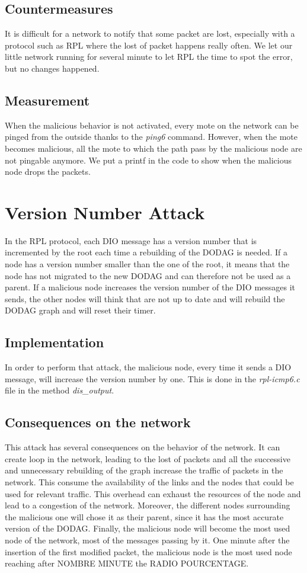 \documentclass{report}
\begin{document}
\subsection*{Countermeasures}
It is difficult for a network to notify that some packet are lost, especially with a protocol such as RPL where the lost of packet happens really often. We let our little network running for several minute to let RPL the time to spot the error, but no changes happened.

\subsection*{Measurement }
When the malicious behavior is not activated, every mote on the network can be pinged from the outside thanks to the \textit{ping6} command. However, when the mote becomes malicious, all the mote to which the path pass by the malicious node are not pingable anymore. We put a printf in the code to show when the malicious node drops the packets. 

\section{Version Number Attack}
In the RPL protocol, each DIO message has a version number that is incremented by the root each time a rebuilding of the DODAG is needed. If a node has a version number smaller than the one of the root, it means that the node has not migrated to the new DODAG and can therefore not be used as a parent. If a malicious node increases the version number of the DIO messages it sends, the other nodes will think that are not up to date and will rebuild the DODAG graph and will reset their timer.

\subsection*{Implementation}
In order to perform that attack, the malicious node, every time it sends a DIO message, will increase the version number by one. This is done in the \textit{rpl-icmp6.c} file in the method \textit{dis\_output}.

\subsection*{Consequences on the network}
This attack has several consequences on the behavior of the network. It can create loop in the network, leading to the lost of packets and all the successive and unnecessary rebuilding of the graph increase the traffic of packets in the network. This consume the availability of the links and the nodes that could be used for relevant traffic. This overhead can exhaust the resources of the node and lead to a congestion of the network. 
Moreover, the different nodes surrounding the malicious one will chose it as their parent, since it has the most accurate version of the DODAG.
Finally, the malicious node will become the most used node of the network, most of the messages passing by it. One minute after the insertion of the first modified packet, the malicious node is the most used node reaching after NOMBRE MINUTE the RADIO POURCENTAGE.
\end{document}
